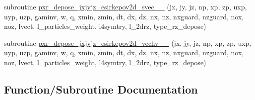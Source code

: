 \begin{DoxyCompactItemize}
subroutine \hyperlink{current__deposition__2d_8_f90_a215d16020f994b7043b8c1b0400faa48}{pxr\+\_\+depose\+\_\+jxjyjz\+\_\+esirkepov2d\+\_\+svec\+\_\+\_} (jx, jy, jz, np, xp, zp, uxp, uyp, uzp, gaminv, w, q, xmin, zmin,                                                                                                                                                                                               dt, dx, dz, nx, nz, nxguard, nzguard,                                                                                                                                                                                               nox, noz, lvect, l\+\_\+particles\+\_\+weight, l4symtry, l\+\_\+2drz, type\+\_\+rz\+\_\+depose)
\item 
subroutine \hyperlink{current__deposition__2d_8_f90_a0cbc0a93a581ce24a8bc06195892fe59}{pxr\+\_\+depose\+\_\+jxjyjz\+\_\+esirkepov2d\+\_\+vechv\+\_\+\_} (jx, jy, jz, np, xp, zp, uxp, uyp, uzp,                               gaminv, w, q, xmin, zmin,                                   dt, dx, dz, nx, nz, nxguard, nzguard,                               nox, noz, lvect, l\+\_\+particles\+\_\+weight, l4symtry, l\+\_\+2drz, type\+\_\+rz\+\_\+depose)
\end{DoxyCompactItemize}


\subsection{Function/\+Subroutine Documentation}

